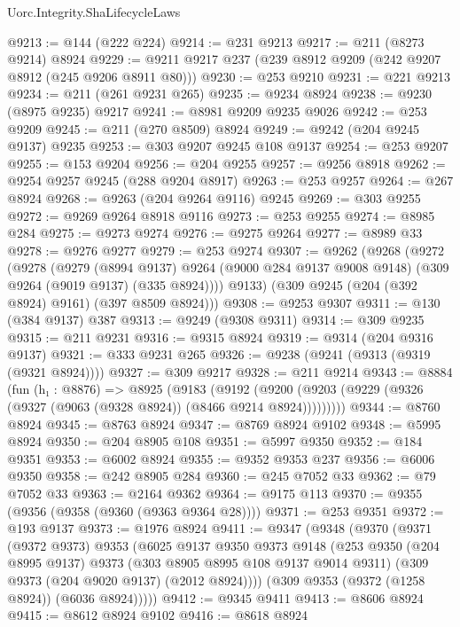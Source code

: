 \begin{lexlean}{Uorc.Integrity.ShaLifecycleLaws}
\begin{coremodule}
@9213 := @144 (@222 @224)
@9214 := @231 @9213
@9217 := @211 (@8273 @9214) @8924
@9229 := @9211 @9217 @237 (@239 @8912 @9209 (@242 @9207 @8912 (@245 @9206 @8911 @80)))
@9230 := @253 @9210
@9231 := @221 @9213
@9234 := @211 (@261 @9231 @265)
@9235 := @9234 @8924
@9238 := @9230 (@8975 @9235) @9217
@9241 := @8981 @9209 @9235 @9026
@9242 := @253 @9209
@9245 := @211 (@270 @8509) @8924
@9249 := @9242 (@204 @9245 @9137) @9235
@9253 := @303 @9207 @9245 @108 @9137
@9254 := @253 @9207
@9255 := @153 @9204
@9256 := @204 @9255
@9257 := @9256 @8918
@9262 := @9254 @9257 @9245 (@288 @9204 @8917)
@9263 := @253 @9257
@9264 := @267 @8924
@9268 := @9263 (@204 @9264 @9116) @9245
@9269 := @303 @9255
@9272 := @9269 @9264 @8918 @9116
@9273 := @253 @9255
@9274 := @8985 @284
@9275 := @9273 @9274
@9276 := @9275 @9264
@9277 := @8989 @33
@9278 := @9276 @9277
@9279 := @253 @9274
@9307 := @9262
    (@9268
      (@9272
        (@9278
          (@9279
            (@8994 @9137)
            @9264
            (@9000 @284 @9137 @9008 @9148)
            (@309 @9264 (@9019 @9137) (@335 @8924))))
        @9133)
      (@309 @9245 (@204 (@392 @8924) @9161) (@397 @8509 @8924)))
@9308 := @9253 @9307
@9311 := @130 (@384 @9137) @387
@9313 := @9249 (@9308 @9311)
@9314 := @309 @9235
@9315 := @211 @9231
@9316 := @9315 @8924
@9319 := @9314 (@204 @9316 @9137)
@9321 := @333 @9231 @265
@9326 := @9238 (@9241 (@9313 (@9319 (@9321 @8924))))
@9327 := @309 @9217
@9328 := @211 @9214
@9343 := @8884
    (fun (h₁ : @8876) =>
    @8925
      (@9183
        (@9192 (@9200 (@9203 (@9229 (@9326 (@9327 (@9063 (@9328 @8924)) (@8466 @9214 @8924)))))))))
@9344 := @8760 @8924
@9345 := @8763 @8924
@9347 := @8769 @8924 @9102
@9348 := @5995 @8924
@9350 := @204 @8905 @108
@9351 := @5997 @9350
@9352 := @184 @9351
@9353 := @6002 @8924
@9355 := @9352 @9353 @237
@9356 := @6006 @9350
@9358 := @242 @8905 @284
@9360 := @245 @7052 @33
@9362 := @79 @7052 @33
@9363 := @2164 @9362
@9364 := @9175 @113
@9370 := @9355 (@9356 (@9358 (@9360 (@9363 @9364 @28))))
@9371 := @253 @9351
@9372 := @193 @9137
@9373 := @1976 @8924
@9411 := @9347
    (@9348
      (@9370
        (@9371
          (@9372 @9373)
          @9353
          (@6025
            @9137
            @9350
            @9373
            @9148
            (@253
              @9350
              (@204 @8995 @9137)
              @9373
              (@303 @8905 @8995 @108 @9137 @9014 @9311)
              (@309 @9373 (@204 @9020 @9137) (@2012 @8924))))
          (@309 @9353 (@9372 (@1258 @8924)) (@6036 @8924)))))
@9412 := @9345 @9411
@9413 := @8606 @8924
@9415 := @8612 @8924 @9102
@9416 := @8618 @8924

\end{coremodule}
\end{lexlean}
